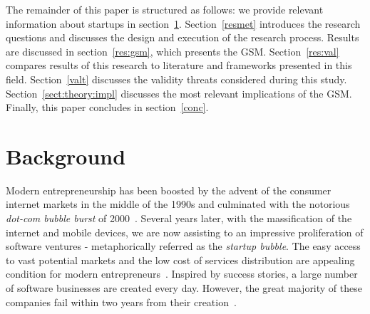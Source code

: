 \documentclass[10pt,journal,letterpaper,compsoc]{IEEEtran}
\begin{document}
The remainder of this paper is structured as follows: we provide relevant
information about startups in section~\ref{backg}. Section~\ref{resmet}
introduces the research questions and discusses the design and execution of the
research process. Results are discussed in section~\ref{res:gsm}, which presents
the GSM. Section~\ref{res:val} compares results of this research to literature
and frameworks presented in this field. Section~\ref{valt} discusses the
validity threats considered during this study. Section~\ref{sect:theory:impl}
discusses the most relevant implications of the GSM. Finally, this paper
concludes in section~\ref{conc}.






 
\section{Background} \label{backg}

Modern entrepreneurship has been boosted by the advent of the consumer internet
markets in the middle of the 1990s and culminated with the notorious \textit
{dot-com bubble burst} of 2000~\cite{Perkins:1999:IBI:555126,
storey1982entrepreneurship}. Several years later, with the massification of the
internet and mobile devices, we are now assisting to an impressive proliferation
of software ventures - metaphorically referred as the \textit{startup bubble}.
The easy access to vast potential markets and the low cost of services
distribution are appealing condition for modern entrepreneurs~\cite{Marmer2011}.
Inspired by success stories, a large number of software businesses are created
every day. However, the great majority of these companies fail within two years
from their creation~\cite{Crowne2002}.
\end{document}

